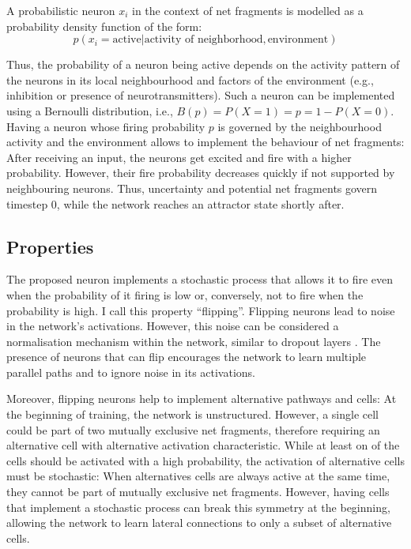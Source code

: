 A probabilistic neuron $x_i$ in the context of net fragments is modelled as a probability density function of the form:
\begin{equation}
    p(x_i = \text{active} | \text{activity of neighborhood}, \text{environment}) 
\end{equation}

Thus, the probability of a neuron being active depends on the activity pattern of the neurons in its local neighbourhood and factors of the environment (e.g., inhibition or presence of neurotransmitters).
Such a neuron can be implemented using a Bernoulli distribution, i.e., $B(p) = P(X = 1) = p = 1 - P(X=0)$. Having a neuron whose firing probability $p$ is governed by the neighbourhood activity and the environment allows to implement the behaviour of net fragments: After receiving an input, the neurons get excited and fire with a higher probability. However, their fire probability decreases quickly if not supported by neighbouring neurons. Thus, uncertainty and potential net fragments govern timestep 0, while the network reaches an attractor state shortly after. 

\subsection{Properties}
The proposed neuron implements a stochastic process that allows it to fire even when the probability of it firing is low or, conversely, not to fire when the probability is high.
I call this property ``flipping''.
Flipping neurons lead to noise in the network's activations.
However, this noise can be considered a normalisation mechanism within the network, similar to dropout layers .
The presence of neurons that can flip encourages the network to learn multiple parallel paths and to ignore noise in its activations.

Moreover, flipping neurons help to implement alternative pathways and cells: At the beginning of training, the network is unstructured.
However, a single cell could be part of two mutually exclusive net fragments, therefore requiring an alternative cell with alternative activation characteristic.
While at least on of the cells should be activated with a high probability, the activation of alternative cells must be stochastic:
When alternatives cells are always active at the same time, they cannot be part of mutually exclusive net fragments.
However, having cells that implement a stochastic process can break this symmetry at the beginning, allowing the network to learn lateral connections to only a subset of alternative cells.

